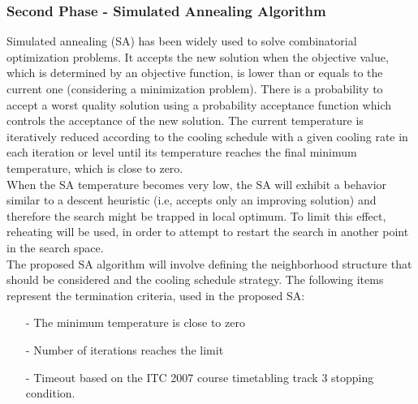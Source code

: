 \subsubsection{Second Phase - Simulated Annealing Algorithm}
\label{subsubsec:genetic-algorithm}
Simulated annealing (SA) has been widely used to solve combinatorial optimization problems. It accepts the new solution when the objective value, which is determined by an objective function, is lower than or equals to the current one (considering a minimization problem). There is a probability to accept a worst quality solution using a probability acceptance function which controls the acceptance of the new solution. The current temperature is iteratively reduced according to the cooling schedule with a given cooling rate in each iteration or level until its temperature reaches the final minimum temperature, which is close to zero.\\ 
When the SA temperature becomes very low, the SA will exhibit a behavior similar to a descent heuristic (i.e, accepts only an improving solution) and therefore the search might be trapped in local optimum. To limit this effect, reheating will be used, in order to attempt to restart the search in another point in the search space.\\
The proposed SA algorithm will involve defining the neighborhood structure that should be considered and the cooling schedule strategy. 
The following items represent the termination criteria, used in the proposed SA:
\begin{itemize}
\item[-] The minimum temperature is close to zero 
\item[-] Number of iterations reaches the limit
\item[-] Timeout based on the ITC 2007 course timetabling track 3 stopping condition.
\end{itemize}

